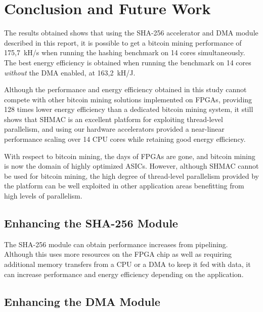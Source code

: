 \chapter{Conclusion and Future Work}
\label{cha:conclusion}

The results obtained shows that using the SHA-256 accelerator and DMA module described in this
report, it is possible to get a bitcoin mining performance of 175,7~kH/s when running the
hashing benchmark on 14 cores simultaneously. The best energy efficiency is obtained when
running the benchmark on 14 cores \emph{without} the DMA enabled, at 163,2~kH/J.

Although the performance and energy efficiency obtained in this study cannot compete
with other bitcoin mining solutions implemented on FPGAs, providing 128 times lower energy efficiency than
a dedicated bitcoin mining system, it still shows that SHMAC is an excellent platform
for exploiting thread-level parallelism, and using our hardware accelerators provided a
near-linear performance scaling over 14 CPU cores while retaining good energy efficiency.

With respect to bitcoin mining, the days of FPGAs are gone, and bitcoin mining is now
the domain of highly optimized ASICs. However, although SHMAC cannot be used for bitcoin
mining, the high degree of thread-level parallelism provided by the platform can be well exploited
in other application areas benefitting from high levels of parallelism.

\section{Enhancing the SHA-256 Module}

The SHA-256 module can obtain performance increases from pipelining. Although this uses more
resources on the FPGA chip as well as requiring additional memory transfers from a CPU or a
DMA to keep it fed with data, it can increase performance and energy efficiency depending
on the application.

\section{Enhancing the DMA Module}

